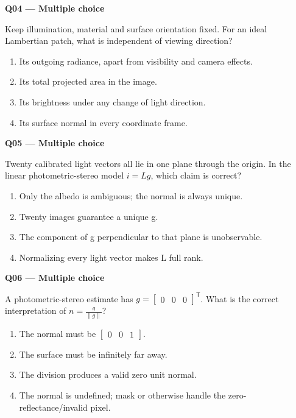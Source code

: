 \documentclass[11pt,a4paper]{article}
\begin{document}
\par\vspace{12pt}
\begin{minipage}{\linewidth}
\textbf{Q04 — Multiple choice}\par\smallskip
Keep illumination,\allowbreak{} material and surface orientation fixed. For an ideal Lambertian patch,\allowbreak{} what is independent of viewing direction?
\begin{enumerate}[label=\textbf{\Alph*.}]
\item Its outgoing radiance,\allowbreak{} apart from visibility and camera effects.
\item Its total projected area in the image.
\item Its brightness under any change of light direction.
\item Its surface normal in every coordinate frame.
\end{enumerate}
\end{minipage}
\par\vspace{12pt}
\begin{minipage}{\linewidth}
\textbf{Q05 — Multiple choice}\par\smallskip
Twenty calibrated light vectors all lie in one plane through the origin. In the linear photometric-stereo model \(i=Lg\),\allowbreak{} which claim is correct?
\begin{enumerate}[label=\textbf{\Alph*.}]
\item Only the albedo is ambiguous; the normal is always unique.
\item Twenty images guarantee a unique g.
\item The component of g perpendicular to that plane is unobservable.
\item Normalizing every light vector makes L full rank.
\end{enumerate}
\end{minipage}
\par\vspace{12pt}
\begin{minipage}{\linewidth}
\textbf{Q06 — Multiple choice}\par\smallskip
A photometric-stereo estimate has \(g=\begin{bmatrix}0&0&0\end{bmatrix}^{\mathsf T}\). What is the correct interpretation of \(n=\frac{g}{\lVert g\rVert}\)?
\begin{enumerate}[label=\textbf{\Alph*.}]
\item The normal must be \(\begin{bmatrix}0&0&1\end{bmatrix}\).
\item The surface must be infinitely far away.
\item The division produces a valid zero unit normal.
\item The normal is undefined; mask or otherwise handle the zero-reflectance/\allowbreak{}invalid pixel.
\end{enumerate}
\end{minipage}
\end{document}
